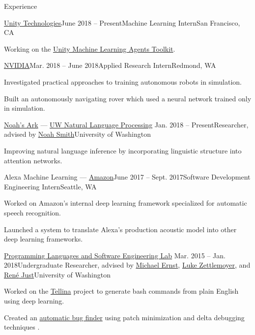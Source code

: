 \documentclass{resume}
\begin{document}
\begin{rSection}{Experience}
  \begin{rSubsection}{{\href{https://unity3d.ai/}{Unity Technologies}}}{June 2018 -- Present}{Machine Learning Intern}{San Francisco, CA}
    \item Working on the \href{https://github.com/Unity-Technologies/ml-agents}{Unity Machine Learning Agents Toolkit}.
  \end{rSubsection}

  \begin{rSubsection}{{\href{http://www.nvidia.com/page/home.html}{NVIDIA}}}{Mar. 2018 -- June 2018}{Applied Research Intern}{Redmond, WA}
    \item Investigated practical approaches to training autonomous robots in simulation.
    \item Built an autonomously navigating rover which used a neural network trained only in simulation.
  \end{rSubsection}

  \begin{rSubsection}{\href{http://www.ark.cs.washington.edu/}{Noah's Ark} --- \href{https://nlp.washington.edu/}{UW Natural Language Processing}}
    {Jan. 2018 -- Present}{Researcher, advised by \href{https://homes.cs.washington.edu/~nasmith/}{Noah Smith}}{University of Washington}
    \item Improving natural language inference by incorporating linguistic structure into attention networks.
  \end{rSubsection}

  \begin{rSubsection}{Alexa Machine Learning --- {\href{https://www.amazon.com/}{Amazon}}}{June 2017 -- Sept. 2017}{Software Development Engineering Intern}{Seattle, WA}
    \item Worked on Amazon's internal deep learning framework specialized for automatic
    speech recognition.
    \item Launched a system to translate Alexa's production acoustic model into other deep learning frameworks.
  \end{rSubsection}

  \begin{rSubsection}{\href{https://uwplse.org/}{Programming Languages and Software Engineering Lab}}
    {Mar. 2015 -- Jan. 2018}{Undergraduate Researcher, advised by \href{https://homes.cs.washington.edu/~mernst/}{Michael Ernst}, \href{https://www.cs.washington.edu/people/faculty/lsz}{Luke Zettlemoyer}, and \href{https://people.cs.umass.edu/~rjust/}{Ren{\'e} Just}}{University of Washington}
  \item Worked on the \href{https://github.com/TellinaTool}{Tellina} project \citep{LinWPVZE2017:TR} to generate bash commands from plain English using deep learning.
  \item Created an \href{https://github.com/dericp/patch-minimization}{automatic bug finder} using patch minimization and delta debugging techniques \citep{PearsonCJFAEPK2017}.
  \end{rSubsection}
  

\end{rSection}
\end{document}
